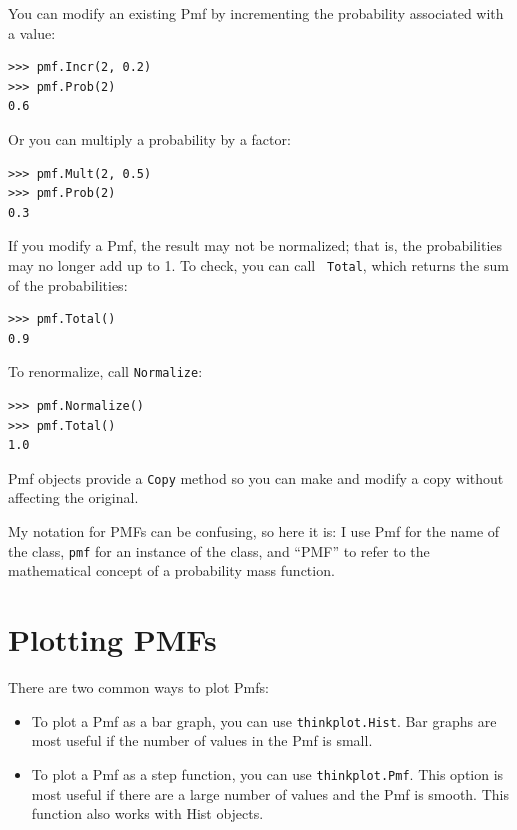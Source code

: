 \documentclass[12pt]{book}
\begin{document}
You can modify an existing Pmf by incrementing the probability
associated with a value:
%
\begin{verbatim}
>>> pmf.Incr(2, 0.2)
>>> pmf.Prob(2)
0.6
\end{verbatim}

Or you can multiply a probability by a factor:
%
\begin{verbatim}
>>> pmf.Mult(2, 0.5)
>>> pmf.Prob(2)
0.3
\end{verbatim}

If you modify a Pmf, the result may not be normalized; that is, the
probabilities may no longer add up to 1.  To check, you can call {\tt
  Total}, which returns the sum of the probabilities:
%
\begin{verbatim}
>>> pmf.Total()
0.9
\end{verbatim}

To renormalize, call {\tt Normalize}:
%
\begin{verbatim}
>>> pmf.Normalize()
>>> pmf.Total()
1.0
\end{verbatim}

Pmf objects provide a {\tt Copy} method so you can make
and modify a copy without affecting the original.

My notation for PMFs can be confusing, so here it is: I use Pmf for
the name of the class, {\tt pmf} for an instance of the class, and
``PMF'' to refer to the mathematical concept of a probability mass
function.


\section{Plotting PMFs}

There are two common ways to plot Pmfs:

\begin{itemize}

\item To plot a Pmf as a bar graph, you can use 
{\tt thinkplot.Hist}.  Bar graphs are most useful if the number
of values in the Pmf is small.

\item To plot a Pmf as a step function, you can use
{\tt thinkplot.Pmf}.  This option is most useful if there are
a large number of values and the Pmf is smooth.  This function
also works with Hist objects.

\end{itemize}
\end{document}
